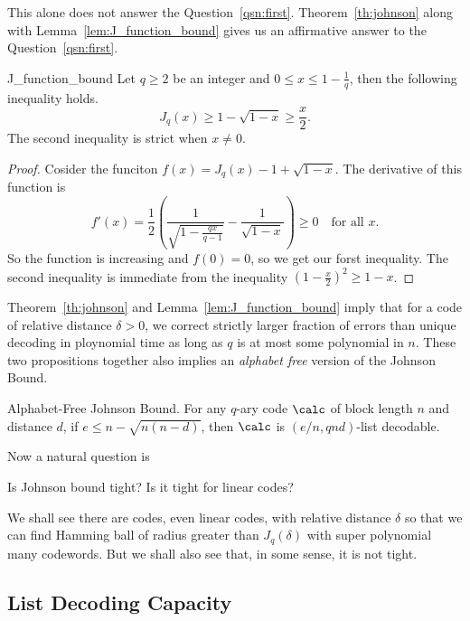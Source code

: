 	This alone does not answer the Question~\ref{qsn:first}. Theorem~\ref{th:johnson} along with Lemma~\ref{lem:J_function_bound} gives us an affirmative answer to the Question~\ref{qsn:first}.
	
	\begin{lemma}{}{J_function_bound}
		Let $q\geq 2$ be an integer and $0\leq x\leq 1-\frac{1}{q}$, then the following inequality holds.
		\[
		J_q(x) \geq 1 - \sqrt{1-x} \geq \frac{x}{2}.
		\]
		The second inequality is strict when $x\neq0$.
	\end{lemma}
	
	\begin{proof}
		Cosider the funciton $f(x) = J_q(x) - 1 + \sqrt{1-x}$. The derivative of this function is 
		\[
		f'(x) = \frac{1}{2}\left(\frac{1}{\sqrt{1 - \frac{qx}{q-1}}} - \frac{1}{\sqrt{1-x}}\right) \geq 0 \quad \text{for all $x$.}
		\]
		So the function is increasing and $f(0) = 0$, so we get our forst inequality. The second inequality is immediate from the inequality $(1-\frac{x}{2})^2\geq 1-x$.
	\end{proof}
	
	Theorem~\ref{th:johnson} and Lemma~\ref{lem:J_function_bound} imply that for a code of relative distance $\delta>0$, we correct strictly larger fraction of errors than unique decoding in ploynomial time as long as $q$ is at most some polynomial in $n$. These two propositions together also implies an \emph{alphabet free} version of the Johnson Bound.
	
	\begin{theorem}{Alphabet-Free Johnson Bound.}{}
		For any $q$-ary code $\calc$ of block length $n$ and distance $d$, if $e\leq n - \sqrt{n(n - d)}$, then $\calc$ is $(e/n, qnd)$-list decodable.
	\end{theorem}
	
	
	Now a natural question is 
	\begin{question}{}{}
		Is Johnson bound tight? Is it tight for linear codes?
	\end{question}
	
	We shall see there are codes, even linear codes, with relative distance $\delta$ so that we can find Hamming ball of radius greater than $J_q(\delta)$ with super polynomial many codewords. But we shall also see that, in some sense, it is not tight.
	
	\subsection{List Decoding Capacity}
	
